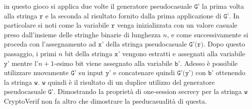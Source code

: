 \documentclass[a4paper,openright,twoside,12pt]{report}
\begin{document}
in questo gioco si applica due volte il generatore pseudocasuale $\texttt{G'}$ la prima volta alla stringa $\texttt{r}$ e la seconda al risultato fornito dalla prima applicazione di $\texttt{G'}$.
In particolare si noti come la variabile $\texttt{r}$ venga inizializzata con un valore casuale preso dall'insieme delle stringhe binarie di lunghezza $n$, e come
successivamente si proceda con l'assegnamento ad $\texttt{x'}$ della stringa pseudocasuale
$\texttt{G'(r)}$. Dopo questo passaggio, i primi $n$ bit della stringa $\texttt{x'}$ vengono estratti e assegnati alla variabile $\texttt{y'}$ mentre l'$n+1$-esimo bit viene assegnato alla variabile 
$\texttt{b'}$. Adesso \`e possibile utilizzare nuovamente $\texttt{G'}$ su input $\texttt{y'}$ e concatenare quindi $\texttt{G'(y')}$ con $\texttt{b'}$ ottenendo la stringa $\texttt{w}$.
$\texttt{w}$ quindi \`e il risultato di un duplice utilizzo del generatore pseudocasuale $\texttt{G'}$. Dimostrando la propriet\`a di one-session secrecy per la stringa $\texttt{w}$ CryptoVerif
non fa altro che dimostrare la pseducasualit\`a di questa.
\newpage
\end{document}
